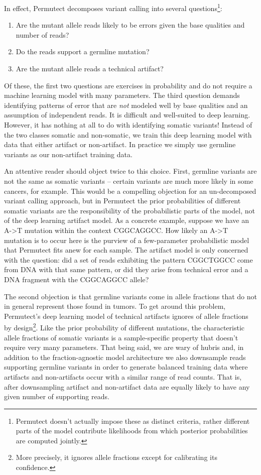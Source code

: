 \documentclass[times, twoside, watermark]{StyleBioRxiv}
\begin{document}
In effect, Permutect decomposes variant calling into several questions\footnote{Permutect doesn't actually impose these as distinct criteria, rather different parts of the model contribute likelihoods from which posterior probabilities are computed jointly.}: 
\begin{enumerate}
    \item Are the mutant allele reads likely to be errors given the base qualities and number of reads?
    \item Do the reads support a germline mutation?
    \item Are the mutant allele reads a technical artifact?
\end{enumerate}
Of these, the first two questions are exercises in probability and do not require a machine learning model with many parameters.  The third question demands identifying patterns of error that are \textit{not} modeled well by base qualities and an assumption of independent reads.  It is difficult and well-suited to deep learning.  However, it has nothing at all to do with identifying somatic variants!  Instead of the two classes somatic and non-somatic, we train this deep learning model with data that either artifact or non-artifact.  In practice we simply use germline variants as our non-artifact training data.

An attentive reader should object twice to this choice.  First, germline variants are not the same as somatic variants -- certain variants are much more likely in some cancers, for example.  This would be a compelling objection for an un-decomposed variant calling approach, but in Permutect the prior probabilities of different somatic variants are the responsibility of the probabilistic parts of the model, not of the deep learning artifact model.  As a concrete example, suppose we have an A->T mutation within the context CGGCAGGCC.  How likely an A->T mutation is to occur here is the purview of a few-parameter probabilistic model that Permutect fits anew for each sample.  The artifact model is only concerned with the question: did a set of reads exhibiting the pattern CGGCTGGCC come from DNA with that same pattern, or did they arise from technical error and a DNA fragment with the CGGCAGGCC allele?

The second objection is that germline variants come in allele fractions that do not in general represent those found in tumors.  To get around this problem, Permutect's deep learning model of technical artifacts ignores of allele fractions by design\footnote{More precisely, it ignores allele fractions except for calibrating its confidence.}.  Like the prior probability of different mutations, the characteristic allele fractions of somatic variants is a sample-specific property that doesn't require very many parameters.  That being said, we are wary of hubris and, in addition to the fraction-agnostic model architecture we also downsample reads supporting germline variants in order to generate balanced training data where artifacts and non-artifacts occur with a similar range of read counts.  That is, after downsampling artifact and non-artifact data are equally likely to have any given number of supporting reads.
\end{document}
